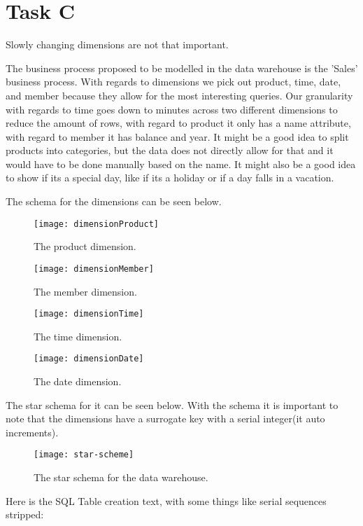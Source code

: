 	\section{Task C}
	Slowly changing dimensions are not that important.
	
	The business process proposed to be modelled in the data warehouse is the 'Sales' business process. With regards to dimensions we pick out product, time, date, and member because they allow for the most interesting queries. Our granularity with regards to time goes down to minutes across two different dimensions to reduce the amount of rows, with regard to product it only has a name attribute, with regard to member it has balance and year. It might be a good idea to split products into categories, but the data does not directly allow for that and it would have to be done manually based on the name. It might also be a good idea to show if its a special day, like if its a holiday or if a day falls in a vacation.
	
	The schema for the dimensions can be seen below. 
	
	\begin{minipage}{0.45\textwidth}
	\begin{figure}[H]
		\centering
		\texttt{[image: dimensionProduct]}
		\label{image:product}
		\caption{The product dimension.}
		\end{figure}
	\end{minipage}
	\begin{minipage}{0.45\textwidth}
	\begin{figure}[H]
	\centering
	\texttt{[image: dimensionMember]}
	\label{image:member}
	\caption{The member dimension.}
	\end{figure}
	\end{minipage}
	
	\begin{minipage}{0.45\textwidth}
	\begin{figure}[H]
	\centering
	\texttt{[image: dimensionTime]}
	\label{image:time}
	\caption{The time dimension.}
	\end{figure}
	\end{minipage}
	\begin{minipage}{0.45\textwidth}
	\begin{figure}[H]
	\centering
	\texttt{[image: dimensionDate]}
	\label{image:date}
	\caption{The date dimension.}
	\end{figure}
	\end{minipage}
	
	The star schema for it can be seen below.  With the schema it is important to note that the dimensions have a surrogate key with a serial integer(it auto increments).
	
	
	\begin{figure}[H]
	\centering
	\texttt{[image: star-scheme]}
	\label{image:starschema}
	\caption{The star schema for the data warehouse.}
	\end{figure}
	
	Here is the SQL Table creation text, with some things like serial sequences stripped:
	
	
		
	


